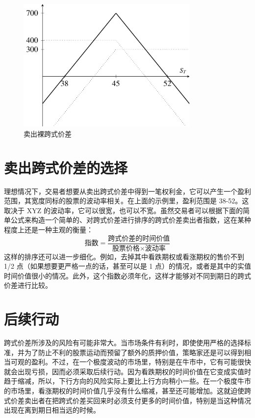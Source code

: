 \begin{figure}
    \begin{center}
        \includegraphics[width=0.8\textwidth]{IMG/fig20-2.pdf}
        \caption{卖出裸跨式价差}
    \end{center}
\end{figure}

\section{卖出跨式价差的选择}
理想情况下，交易者想要从卖出跨式价差中得到一笔权利金，它可以产生一个盈利范围，其宽度同标的股票的波动率相关。在上面的示例里，盈利范围是 38-52。这取决于 XYZ 的波动率，它可以很宽，也可以不宽。虽然交易者可以根据下面的简单公式来构造一个简单的、对跨式价差进行排序的跨式价差卖出者指数，这在某种程度上还是一种主观的衡量：
\begin{equation*}
    \text{指数}=\frac{\text{跨式价差的时间价值}}{\text{股票价格}\times \text{波动率}}
\end{equation*}
这样的排序还可以进一步细化。例如，去掉其中看跌期权或看涨期权的售价不到 1/2 点（如果想要更严格一点的话，甚至可以是 1 点）的情况，或者是其中的实值时间价值很小的情况。此外，这个指数必须年化，这样才能够对不同到期日的跨式价差进行比较。
\section{后续行动}
跨式价差所涉及的风险有可能非常大。当市场条件有利时，即使使用严格的选择标准，并为了防止不利的股票运动而预留了额外的质押价值，策略家还是可以得到相当可观的盈利。不过，在一个极度波动的市场里，特别是在牛市中，它有可能很快就会出现亏损，因而必须采取后续行动。因为看跌期权的时间价值在它变成实值时趋于缩减，所以，下行方向的风险实际上要比上行方向稍小一些。在一个极度牛市的市场里，看涨期权的时间价值几乎没有什么缩减，甚至还可能增加。这就迫使跨式价差卖出者在把跨式价差买回来时必须支付更多的时间价值，特别是当这种情况出现在离到期日相当远的时候。

